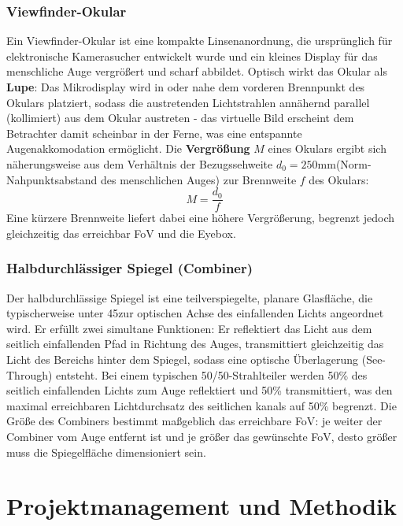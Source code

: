\subsubsection{Viewfinder-Okular}
\label{subsubsec:Viewfinder-Okular}
Ein Viewfinder-Okular ist eine kompakte Linsenanordnung, die ursprünglich für elektronische Kamerasucher entwickelt wurde und ein kleines Display für das menschliche Auge vergrößert und scharf abbildet. Optisch wirkt das Okular als \textbf{Lupe}: Das Mikrodisplay wird in oder nahe dem vorderen Brennpunkt des Okulars platziert, sodass die austretenden Lichtstrahlen annähernd parallel (kollimiert) aus dem Okular austreten - das virtuelle Bild erscheint dem Betrachter damit scheinbar in der Ferne, was eine entspannte Augenakkomodation ermöglicht. Die \textbf{Vergrößung} $M$ eines Okulars ergibt sich näherungsweise aus dem Verhältnis der Bezugssehweite $d_0=250\text{mm}$(Norm-Nahpunktsabstand des menschlichen Auges) zur Brennweite $f$ des Okulars: $$M=\frac{d_0}{f}$$
Eine kürzere Brennweite liefert dabei eine höhere Vergrößerung, begrenzt jedoch gleichzeitig das erreichbar \ac{FoV} und die Eyebox.\autocite[vgl. S.439 ff.]{smithModernOpticalEngineering2008}\autocite[vgl. S.428 ff.]{hechtOptik2023}

\subsubsection{Halbdurchlässiger Spiegel (Combiner)}
\label{subsubsex:halbdurchläsigerSpiegel}
Der halbdurchlässige Spiegel ist eine teilverspiegelte, planare Glasfläche, die typischerweise unter 45\textdegree\space zur optischen Achse des einfallenden Lichts angeordnet wird. Er erfüllt zwei simultane Funktionen: Er reflektiert das Licht aus dem seitlich einfallenden Pfad in Richtung des Auges, transmittiert gleichzeitig das Licht des Bereichs hinter dem Spiegel, sodass eine optische Überlagerung (See-Through) entsteht. Bei einem typischen 50/50-Strahlteiler werden 50\% des seitlich einfallenden Lichts zum Auge reflektiert und 50\% transmittiert, was den maximal erreichbaren Lichtdurchsatz des seitlichen kanals auf 50\% begrenzt.
Die Größe des Combiners bestimmt maßgeblich das erreichbare \ac{FoV}: je weiter der Combiner vom Auge entfernt ist und je größer das gewünschte \ac{FoV}, desto größer muss die Spiegelfläche dimensioniert sein.\autocite[vgl. S.197 ff. S.231 ff.]{hechtOptik2023}

\section{Projektmanagement und Methodik}
\label{ProjektundMethodik}



